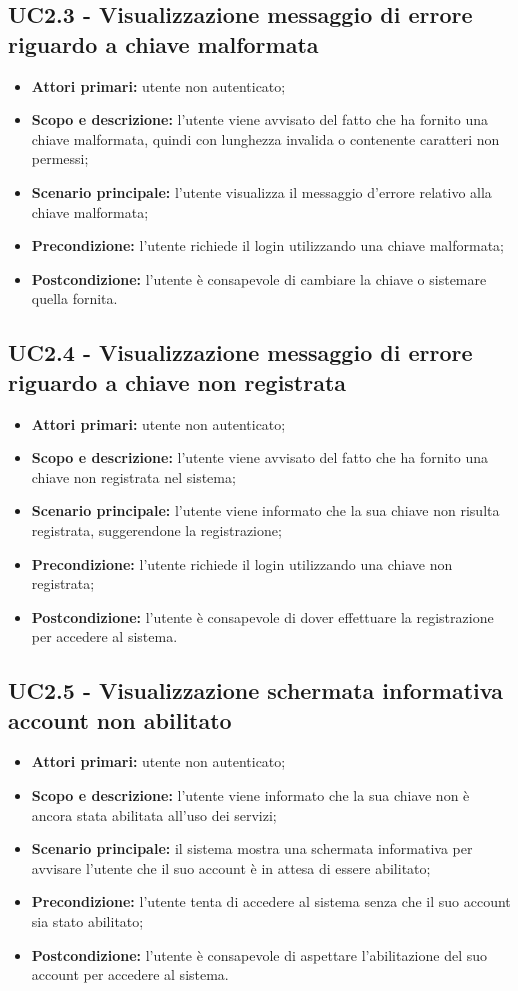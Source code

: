 \documentclass[AnalisiDeiRequisiti.tex]{subfiles}
\begin{document}
\subsection{UC2.3 - Visualizzazione messaggio di errore riguardo a chiave malformata}
\begin{itemize}
	\item \textbf{Attori primari:} utente non autenticato;
	\item \textbf{Scopo e descrizione:} l'utente viene avvisato del fatto che ha fornito una chiave malformata, quindi con lunghezza invalida o contenente caratteri non permessi;
	\item \textbf{Scenario principale:} l'utente visualizza il messaggio d'errore relativo alla chiave malformata;
	\item \textbf{Precondizione:} l'utente richiede il login utilizzando una chiave malformata;
	\item \textbf{Postcondizione:} l'utente è consapevole di cambiare la chiave o sistemare quella fornita.
\end{itemize}
\subsection{UC2.4 - Visualizzazione messaggio di errore riguardo a chiave non registrata}
\begin{itemize}
	\item \textbf{Attori primari:} utente non autenticato;
	\item \textbf{Scopo e descrizione:} l'utente viene avvisato del fatto che ha fornito una chiave non registrata nel sistema;
	\item \textbf{Scenario principale:} l'utente viene informato che la sua chiave non risulta registrata, suggerendone la registrazione;
	\item \textbf{Precondizione:} l'utente richiede il login utilizzando una chiave non registrata;
	\item \textbf{Postcondizione:} l'utente è consapevole di dover effettuare la registrazione per accedere al sistema.
\end{itemize}
\subsection{UC2.5 - Visualizzazione schermata informativa account non abilitato}
\begin{itemize}
	\item \textbf{Attori primari:} utente non autenticato;
	\item \textbf{Scopo e descrizione:} l'utente viene informato che la sua chiave non è ancora stata abilitata all'uso dei servizi;
	\item \textbf{Scenario principale:} il sistema mostra una schermata informativa per avvisare l'utente che il suo account è in attesa di essere abilitato;
	\item \textbf{Precondizione:} l'utente tenta di accedere al sistema senza che il suo account sia stato abilitato; 
	\item \textbf{Postcondizione:} l'utente è consapevole di aspettare l'abilitazione del suo account per accedere al sistema.
\end{itemize}
\end{document}
